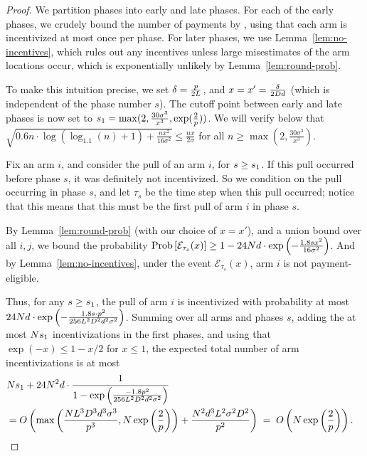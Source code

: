 \begin{proof}
We partition phases into early and late phases.
For each of the early phases,
we crudely bound the number of payments by \ARMNUM,
using that each arm is incentivized at most once per phase.
For later phases,
we use Lemma~\ref{lem:no-incentives},
which rules out any incentives unless large misestimates of the arm
locations occur, which is exponentially unlikely by 
Lemma~\ref{lem:round-prob}.

To make this intuition precise, we set
$\delta = \frac{p}{2 L}$,
and $x = x' = \frac{\delta}{2 D d}$
(which is independent of the phase number $s$).
The cutoff point between early and late phases is now set to
$s_1 = \max(2, \frac{30 \sigma^3}{x^3}, \exp(\frac{2}{p}))$.
We will verify below that
$\sqrt{0.6 n \cdot \log (\log_{1.1}(n) + 1) + \frac{n x^2}{16 \sigma^2}}
\leq \frac{n x}{2 \sigma}$
for all $n \geq \max(2, \frac{30 \sigma^3}{x^3})$.

Fix an arm $i$, and consider the  pull of an arm $i$,
for $s \geq s_1$.
If this pull occurred before phase $s$, it was definitely not incentivized.
So we condition on the pull occurring in phase $s$,
and let $\tau_s$ be the time step when this pull occurred;
notice that this means that this must be the first pull of arm $i$ in
phase $s$.

By Lemma~\ref{lem:round-prob} (with our choice of $x = x'$),
and a union bound over all $i,j$, we bound the probability
$\Prob{\AccEU{\tau_s}{x}}
\geq 1 - 24 \ARMNUM d \cdot \exp\left(-\frac{1.8 s x^2}{16 \sigma^2} \right)$.
And by Lemma~\ref{lem:no-incentives},
under the event ${\mathcal E}_{\tau_s}(x)$,
arm $i$ is not payment-eligible.

Thus, for any $s \geq s_1$,
the  pull of arm $i$ is incentivized  
with probability at most
$24 N d \cdot \exp \left(
  -\frac{1.8 s \cdot p^2}{256 L^2 D^2 d^2 \sigma^2}
\right)$.
Summing over all arms and phases $s$,
adding the at most $N s_1$ incentivizations in
the first \EvenLaterPhase phases, 
and using that $\exp(-x) \leq 1-x/2$ for $x \leq 1$,
the expected total number of arm incentivizations is at most
\begin{align*}
\lefteqn{\ARMNUM \EvenLaterPhase
  + 24 \ARMNUM^2 d \cdot \frac{1}{1 - \exp \left(
    \frac{-1.8 \MinProb^2}{256 \TieDensity^2 \Diam^2 d^2 \sigma^2}
  \right)}}  \\
& = O\left( \max\left(\frac{\ARMNUM \TieDensity^3 \Diam^3 d^3 \sigma^3}{\MinProb^3}, N\exp\left(\frac{2}{p}\right)\right)
  + \frac{\ARMNUM^2 d^3 \TieDensity^2 \sigma^2 \Diam^2}{\MinProb^2} \right)
\; = \; O\left( N\exp\left(\frac{2}{p}\right) \right).
\end{align*}


\end{proof}
